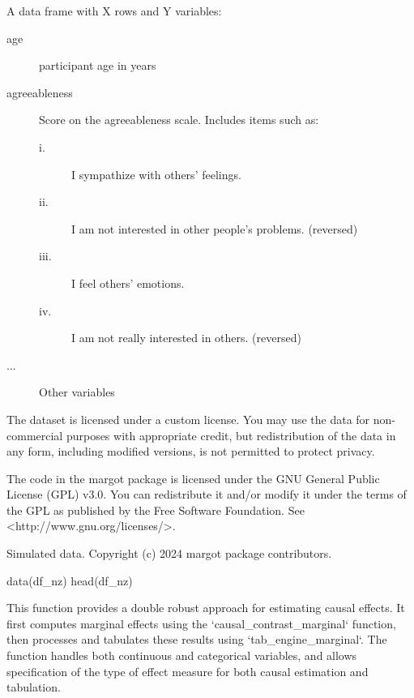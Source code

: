 \documentclass[a4paper]{book}
\begin{document}
\begin{Format}
A data frame with X rows and Y variables:
\begin{description}

\item[age] participant age in years
\item[agreeableness] Score on the agreeableness scale. Includes items such as:
\begin{description}

\item[i.] I sympathize with others' feelings.
\item[ii.] I am not interested in other people's problems. (reversed)
\item[iii.] I feel others' emotions.
\item[iv.] I am not really interested in others. (reversed)

\end{description}


\item[...] Other variables

\end{description}

\end{Format}
%
\begin{Details}
The dataset is licensed under a custom license. You may use the data for non-commercial purposes with appropriate credit, but redistribution of the data in any form, including modified versions, is not permitted to protect privacy.

The code in the margot package is licensed under the GNU General Public License (GPL) v3.0. You can redistribute it and/or modify it under the terms of the GPL as published by the Free Software Foundation. See <http://www.gnu.org/licenses/>.
\end{Details}
%
\begin{Source}
Simulated data. Copyright (c) 2024 margot package contributors.
\end{Source}
%
\begin{Examples}
\begin{ExampleCode}
data(df_nz)
head(df_nz)
\end{ExampleCode}
\end{Examples}
%
\begin{Description}
This function provides a double robust approach for estimating causal effects. It first computes
marginal effects using the `causal\_contrast\_marginal` function, then processes and tabulates these
results using `tab\_engine\_marginal`. The function handles both continuous and categorical variables,
and allows specification of the type of effect measure for both causal estimation and tabulation.
\end{Description}
\end{document}

